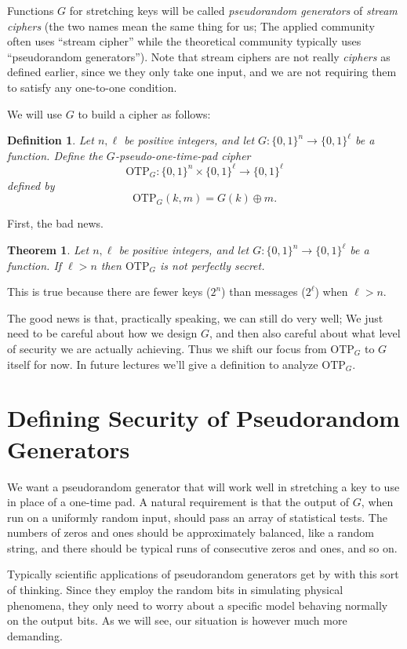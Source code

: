\documentclass[11pt]{article}
\newtheorem{theorem}{Theorem}
\newtheorem{definition}{Definition}
\newcommand{\bits}{\{0,1\}}
\newcommand{\otp}{\mathrm{OTP}}
\begin{document}
Functions $G$ for stretching keys will be called \emph{pseudorandom generators}
of \emph{stream ciphers} (the two names mean the same thing for us; The applied
community often uses ``stream cipher'' while the theoretical community
typically uses ``pseudorandom generators''). Note that stream ciphers are not
really \emph{ciphers} as defined earlier, since we they only take one input,
and we are not requiring them to satisfy any one-to-one condition.

We will use $G$ to build a cipher as follows:
\begin{definition}
    Let $n,\ell$ be positive integers, and let
    $G:\bits^n\to\bits^\ell$ be a function. Define the
    \emph{$G$-pseudo-one-time-pad cipher}
    \[
        \otp_G:\bits^n\times\bits^\ell\to\bits^\ell
    \]
    defined by
    \[
        \otp_G(k,m) = G(k)\oplus m.
    \]
\end{definition}

First, the bad news.
\begin{theorem}
    Let $n,\ell$ be positive integers, and let
    $G:\bits^n\to\bits^\ell$ be a function. If $\ell > n$ then
    $\otp_G$ is not perfectly secret.
\end{theorem}
This is true because there are fewer keys ($2^n$) than messages ($2^\ell$) when
$\ell > n$.

The good news is that, practically speaking, we can still do very well; We just
need to be careful about how we design $G$, and then also careful about what
level of security we are actually achieving. Thus we shift our focus from
$\otp_G$ to $G$ itself for now. In future lectures we'll give a definition to
analyze $\otp_G$.

\section{Defining Security of Pseudorandom Generators}

We want a pseudorandom generator that will work well in stretching a key to use
in place of a one-time pad. A natural requirement is that the output of $G$,
when run on a uniformly random input, should pass an array of statistical
tests. The numbers of zeros and ones should be approximately balanced, like a
random string, and there should be typical runs of consecutive zeros and ones,
and so on.

Typically scientific applications of pseudorandom generators get by with this
sort of thinking. Since they employ the random bits in simulating physical
phenomena, they only need to worry about a specific model behaving normally
on the output bits.
As we will see, our situation is however much more demanding. 
\end{document}
